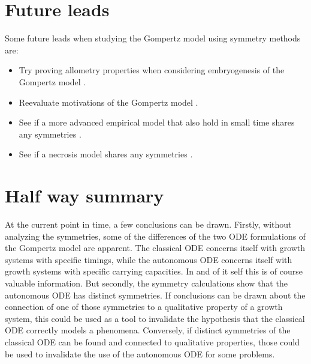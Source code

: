 



\section{Future leads}

Some future leads when studying the Gompertz model using symmetry methods are:
\begin{itemize}
  \item Try proving allometry properties when considering embryogenesis of the Gompertz model \cite{deakin1970allometry}.
  \item Reevaluate motivations of the Gompertz model \cite{bajzer1997tumor}.
  \item See if a more advanced empirical model that also hold in small time shares any symmetries \cite{frenzen1986justification}.
  \item See if a necrosis model shares any symmetries \cite{milotti2012interplay}.
\end{itemize}

\section{Half way summary}

At the current point in time, a few conclusions can be drawn.
Firstly, without analyzing the symmetries, some of the differences of the two ODE formulations of the Gompertz model are apparent.
The classical ODE concerns itself with growth systems with specific timings, while the autonomous ODE concerns itself with growth systems with specific carrying capacities.
In and of it self this is of course valuable information.
But secondly, the symmetry calculations show that the autonomous ODE has distinct symmetries.
If conclusions can be drawn about the connection of one of those symmetries to a qualitative property of a growth system, this could be used as a tool to invalidate the hypothesis that the classical ODE correctly models a phenomena.
Conversely, if distinct symmetries of the classical ODE can be found and connected to qualitative properties, those could be used to invalidate the use of the autonomous ODE for some problems.
